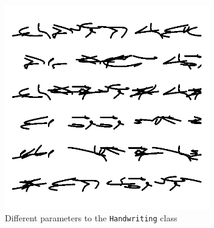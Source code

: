 \documentclass[12pt]{article}
\begin{document}
\begin{figure}[ht]
	\centering
	\includegraphics[width=3.5in]{tweaked.png}
	\vspace{-18pt}
	\caption{Different parameters to the \texttt{Handwriting} class}
	\label{tweaked}
\end{figure}
\vfill


\end{document}
